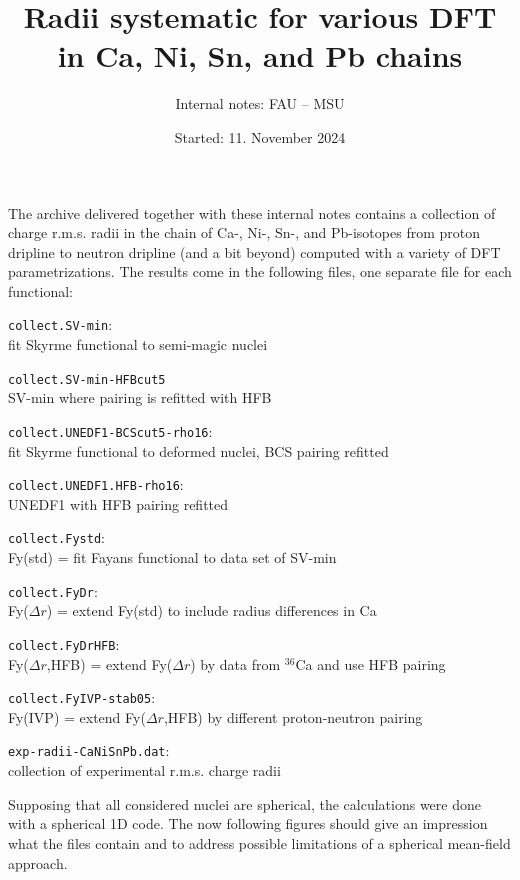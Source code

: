 \documentclass[12pt]{article}
\begin{document}
\title{Radii systematic for various DFT in Ca, Ni, Sn, and Pb chains}
\author{Internal notes: FAU -- MSU}
\date{Started: 11. November 2024}
\maketitle

The archive delivered together with these internal notes contains a
collection of charge r.m.s. radii in the chain of Ca-, Ni-, Sn-, and
Pb-isotopes from proton dripline to neutron dripline (and a bit
beyond) computed with a variety of DFT parametrizations. The results
come in the following files, one separate file for each functional:
\begin{description}
\item{\texttt{collect.SV-min}:}
 \\
 fit Skyrme functional to semi-magic nuclei   \cite{Kluepfel2009} \\[-20pt]
\item{\texttt{collect.SV-min-HFBcut5}} \\
 SV-min where pairing is refitted with HFB \\[-20pt]
\item{\texttt{collect.UNEDF1-BCScut5-rho16}:} \\
 fit Skyrme functional to deformed nuclei, BCS pairing refitted
 \cite{Kortelainen2012}\\[-20pt] 
\item{\texttt{collect.UNEDF1.HFB-rho16}:} \\
  UNEDF1 with HFB pairing refitted\\[-20pt]
\item{\texttt{collect.Fystd}:} \\
Fy(std) = fit Fayans functional to data set of SV-min  \cite{Reinhard2017} \\[-20pt]
\item{\texttt{collect.FyDr}:} \\
Fy($\Delta r$) = extend Fy(std) to include radius differences
in Ca   \cite{Reinhard2017} \\[-20pt]
\item{\texttt{collect.FyDrHFB}:} \\
Fy($\Delta r$,HFB) = extend Fy($\Delta r$)
by data from $^{36}$Ca and use HFB pairing  \cite{Miller2019} \\[-20pt]
\item{\texttt{collect.FyIVP-stab05}:} \\
Fy(IVP) = extend Fy($\Delta r$,HFB) by
different proton-neutron pairing  \cite{Wang2024} \\[-20pt]
\item{\texttt{exp-radii-CaNiSnPb.dat}:} \\
 collection of experimental r.m.s. charge radii 
\end{description}
Supposing that all considered nuclei are spherical, the calculations
were done with a spherical 1D code. The now following figures should
give an impression what the files contain and to address possible
limitations of a spherical mean-field approach.
\end{document}
